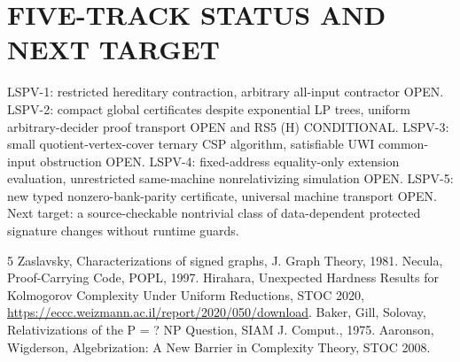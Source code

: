 \documentclass{article}
\begin{document}
\section{FIVE-TRACK STATUS AND NEXT TARGET}
LSPV-1: restricted hereditary contraction, arbitrary all-input contractor OPEN. LSPV-2: compact global certificates despite exponential LP trees, uniform arbitrary-decider proof transport OPEN and RS5 (H) CONDITIONAL. LSPV-3: small quotient-vertex-cover ternary CSP algorithm, satisfiable UWI common-input obstruction OPEN. LSPV-4: fixed-address equality-only extension evaluation, unrestricted same-machine nonrelativizing simulation OPEN. LSPV-5: new typed nonzero-bank-parity certificate, universal machine transport OPEN. Next target: a source-checkable nontrivial class of data-dependent protected signature changes without runtime guards.

\begin{thebibliography}{5}
 Zaslavsky, Characterizations of signed graphs, J. Graph Theory, 1981.
 Necula, Proof-Carrying Code, POPL, 1997.
 Hirahara, Unexpected Hardness Results for Kolmogorov Complexity Under Uniform Reductions, STOC 2020, \url{https://eccc.weizmann.ac.il/report/2020/050/download}.
 Baker, Gill, Solovay, Relativizations of the P = ? NP Question, SIAM J. Comput., 1975.
 Aaronson, Wigderson, Algebrization: A New Barrier in Complexity Theory, STOC 2008.
\end{thebibliography}
\end{document}
